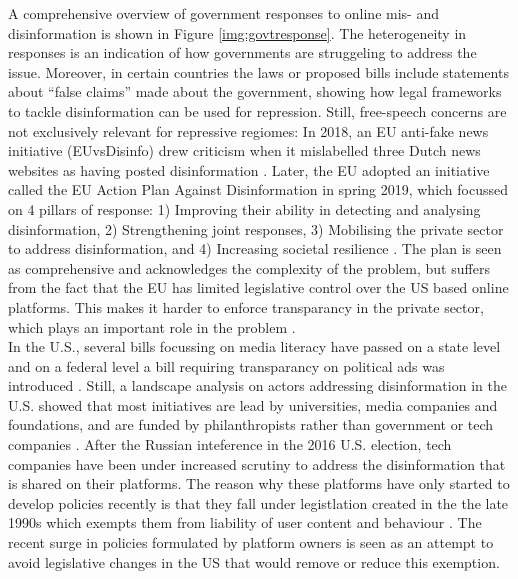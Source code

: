 \documentclass[10pt,a4paper]{article}
\begin{document}
A comprehensive overview of government responses to online mis- and disinformation is shown in Figure \ref{img:govtresponse}. The heterogeneity in responses is an indication of how governments are struggeling to address the issue. Moreover, in certain countries the laws or proposed bills include statements about ``false claims'' made about the government, showing how legal frameworks to tackle disinformation can be used for repression. Still, free-speech concerns are not exclusively relevant for repressive regiomes: In 2018, an EU anti-fake news initiative (EUvsDisinfo) drew criticism when it mislabelled three Dutch news websites as having posted disinformation \citep{Schenk2018}. Later, the EU adopted an initiative called the EU Action Plan Against Disinformation in spring 2019, which focussed on 4 pillars of response: 1) Improving their ability in detecting and analysing disinformation, 2) Strengthening joint responses, 3) Mobilising the private sector to address disinformation, and 4) Increasing societal resilience \cite{EuropeanCommission2018, kouroutakis2020eu}. The plan is seen as comprehensive and acknowledges the complexity of the problem, but suffers from the fact that the EU has limited legislative control over the US based online platforms. This makes it harder to enforce transparancy in the private sector, which plays an important role in the problem \citep{nenadic2019unpacking}. \\

In the U.S., several bills focussing on media literacy have passed on a state level and on a federal level a bill requiring transparancy on political ads was introduced \citep{Funke2020}. Still, a landscape analysis on actors addressing disinformation in the U.S. showed that most initiatives are lead by universities, media companies and foundations, and are funded by philanthropists rather than government or tech companies \citep{Legg2018}. After the Russian inteference in the 2016 U.S. election, tech companies have been under increased scrutiny to address the disinformation that is shared on their platforms. The reason why these platforms have only started to develop policies recently is that they fall under legistlation created in the the late 1990s which exempts them from liability of user content and behaviour \cite{bowers2020answering}. The recent surge in policies formulated by platform owners is seen as an attempt to avoid legislative changes in the US that would remove or reduce this exemption. \\\\
\end{document}
